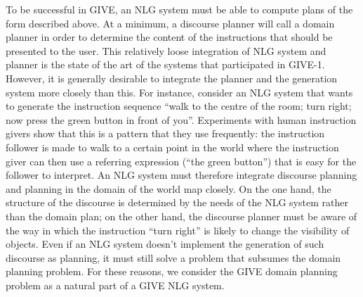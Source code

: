 To be successful in GIVE, an NLG system must be able to compute plans of
the form described above. At a minimum, a discourse planner will call a
domain planner in order to determine the content of the instructions that
should be presented to the user. This relatively loose integration of
NLG system and planner is the state of the art of the systems that
participated in GIVE-1. However, it is generally desirable to integrate the
planner and the generation system more closely than this. For instance,
consider an NLG system that wants to generate the instruction sequence
``walk to the centre of the room; turn right; now press the green button in
front of you''. Experiments with human instruction givers \citep{stoia:08}
show that this is a pattern that they use frequently: the instruction
follower is made to walk to a certain point in the world where the
instruction giver can then use a referring expression (``the green
button'') that is easy for the follower to interpret. An NLG system must
therefore integrate discourse planning and planning in the domain of the
world map closely. On the one hand, the structure of the discourse is
determined by the needs of the NLG system rather than the domain plan; on
the other hand, the discourse planner must be aware of the way in which the
instruction ``turn right'' is likely to change the visibility of objects.
Even if an NLG system doesn't implement the generation of such discourse as
planning, it must still solve a problem that subsumes the domain planning
problem. For these reasons, we consider the GIVE domain planning problem as
a natural part of a GIVE NLG system.  

